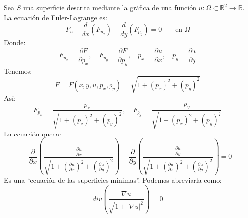\begin{ejemplo} %
    Sea $S$ una superficie descrita mediante la gráfica de una función $u:\Omega\subset\mathbb{R}^2\to \mathbb{R}$. 
    La ecuación de Euler-Lagrange es:
    \begin{equation*}
        F_u - \frac{d}{dx}(F_{p_x}) - \frac{d}{dy}(F_{p_y}) = 0 \qquad \text{en\ } \Omega
    \end{equation*}
    Donde:
    \begin{equation*}
        F_{p_x} = \frac{\partial F}{\partial p_x}, \quad F_{p_y} = \frac{\partial F}{\partial p_y}, \quad p_x = \frac{\partial u}{\partial x},\quad p_y = \frac{\partial u}{\partial y}
    \end{equation*}
    Tenemos:
    \begin{equation*}
        F = F(x,y,u,p_x,p_y) = \sqrt{1+{(p_x)}^{2} + {(p_y)}^{2}}
    \end{equation*}
    Así:
    \begin{equation*}
        F_{p_x} = \frac{p_x}{\sqrt{1+{(p_x)}^{2}+{(p_y)}^{2}}}, \quad F_{p_y} = \frac{p_y}{\sqrt{1+{(p_x)}^{2}+{(p_y)}^{2}}}
    \end{equation*}
    La ecuación queda:
    \begin{equation*}
        -\frac{\partial }{\partial x}\left(\frac{\frac{\partial u}{\partial x}}{\sqrt{1+{\left(\frac{\partial u}{\partial x}\right)}^{2}+{\left(\frac{\partial u}{\partial y}\right)}^{2}}}\right) - \frac{\partial }{\partial y}\left(\frac{\frac{\partial u}{\partial y}}{\sqrt{1+{(\frac{\partial u}{\partial x})}^{2}+{\left(\frac{\partial u}{\partial y}\right)}^{2}}}\right) = 0
    \end{equation*}
    Es una ``ecuación de las superficies mínimas''. Podemos abreviarla como:
    \begin{equation*}
        div\left(\frac{\nabla u}{\sqrt{1+|\nabla u|^2}}\right) = 0
    \end{equation*}
\end{ejemplo}

